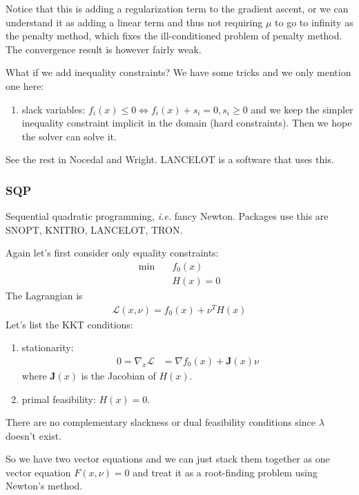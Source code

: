 \documentclass[class=article,crop=false]{standalone}
\begin{document}
Notice that this is adding a regularization term to the gradient ascent, or we can understand it as adding a linear term and thus not requiring $ \mu$ to go to infinity as the penalty method, which fixes the ill-conditioned problem of penalty method. The convergence result is however fairly weak.

What if we add inequality constraints? We have some tricks and we only mention one here:
\begin{enumerate}[label=(\arabic*)]
	\item slack variables: $ f_i(x) \leq 0 \iff f_i(x) + s_i=0 , s_i\geq 0$ and we keep the simpler inequality constraint implicit in the domain (hard constraints). Then we hope the solver can solve it.
\end{enumerate}
See the rest in Nocedal and Wright. LANCELOT is a software that uses this.

\subsubsection{SQP}
Sequential quadratic programming, \emph{i.e.} fancy Newton. Packages use this are SNOPT, KNITRO, LANCELOT, TRON.

Again let's first consider only equality constraints:
\begin{align*}
\min\quad &f_0(x) \\
			 &H(x) = 0
\end{align*}
The Lagrangian is
\begin{align*}
	\mathscr{L}(x,\nu) = f_0(x) + \nu^{T} H(x)
\end{align*}
Let's list the KKT conditions:
\begin{enumerate}[label=(\arabic*)]
	\item stationarity: 
		\begin{align*}
			0 = \nabla _x \mathscr{L} &= \nabla f_0(x) + \mathbf{J}(x) \nu
		\end{align*}
		where $ \mathbf{J}(x)$ is the Jacobian of  $ H(x)$.
	\item primal feasibility: $ H(x) = 0$.
\end{enumerate}
There are no complementary slackness or dual feasibility conditions since $ \lambda$ doesn't exist.

So we have two vector equations and we can just stack them together as one vector equation $ F(x,\nu) = 0$ and treat it as a root-finding problem using Newton's method.
\end{document}
